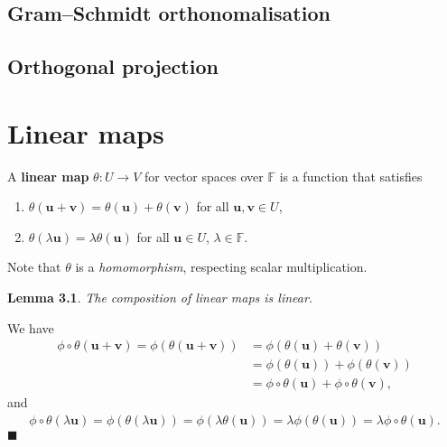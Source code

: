 \documentclass[letter-paper]{tufte-book}
\newtheorem{lemma}[theorem]{\color{pastel-blue}Lemma}
\newenvironment{proof}[1][Proof]{\begin{trivlist}
\item[\hskip \labelsep {\bfseries #1}]}{\end{trivlist}}
\newcommand{\ub}{{\boldsymbol{u}}}
\newcommand{\vb}{{\boldsymbol{v}}}
\newcommand{\qed}{\hfill$\blacksquare$}
\begin{document}

\section{Gram--Schmidt orthonomalisation}


\section{Orthogonal projection}


\chapter{Linear maps}

A \textbf{linear map} $\theta : U \to V$ for vector spaces over $\mathbb{F}$ is
a function that satisfies
\begin{enumerate}
  \item $\theta(\ub + \vb) = \theta(\ub) + \theta(\vb)$ for all $\ub, \vb \in U$,
  \item $\theta(\lambda \ub) = \lambda \theta(\ub)$ for all $\ub \in U$,
  $\lambda \in \mathbb{F}$.
\end{enumerate}

Note that $\theta$ is a \emph{homomorphism}, respecting scalar multiplication.

\begin{lemma}
  \item The composition of linear maps is linear.
\end{lemma}

\begin{proof}
  We have
  \begin{align*}
    \phi \circ \theta(\ub + \vb) = \phi(\theta(\ub + \vb)) &= \phi(\theta(\ub) + \theta(\vb)) \\
      & = \phi(\theta(\ub)) + \phi(\theta(\vb)) \\
      & = \phi \circ \theta(\ub) + \phi \circ \theta(\vb),
  \end{align*}
  and
  \begin{align*}
    \phi \circ \theta(\lambda\ub) = \phi(\theta(\lambda\ub)) = \phi(\lambda\theta(\ub)) = \lambda\phi(\theta(\ub)) = \lambda \phi \circ \theta(\ub).
  \end{align*}
  \qed
\end{proof}
\end{document}
